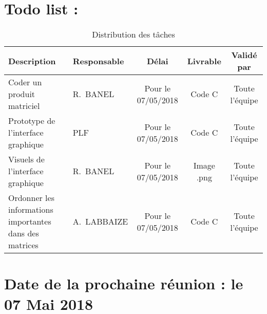 \documentclass[11pt]{meetingmins}
\begin{document}
\section{Todo list :}
\begin{table}[h]
    \centering
    \begin{tabular}{|p{4cm}|p{3cm}|c|c|c|}
    \hline
        \rowcolor{yellow} Description  & Responsable & Délai & Livrable & Validé par 
        \tabularnewline \hline
        
        Coder un produit matriciel & R.~BANEL & Pour le 07/05/2018 & Code C & Toute l'équipe \tabularnewline \hline
        
        Prototype de l'interface graphique & PLF & Pour le 07/05/2018 & Code C & Toute l'équipe
        \tabularnewline \hline 
        
        Visuels de l'interface graphique & R.~BANEL & Pour le 07/05/2018 & Image .png & Toute l'équipe
        \tabularnewline \hline 
        
        Ordonner les informations importantes dans des matrices  & A.~LABBAIZE & Pour le 07/05/2018 & Code C & Toute l'équipe \tabularnewline \hline
        
        
        
    \end{tabular}
    \caption{Distribution des tâches}
    \label{tab:my_label}
\end{table}

\section{Date de la prochaine réunion : \textnormal{le 07 Mai 2018} }
\end{document}
